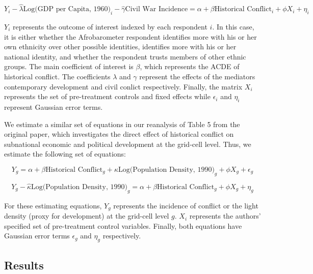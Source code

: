 \begin{equation}
Y_i - \widehat{\lambda} \text{Log(GDP per Capita, 1960)}_i - \widehat{\gamma} \text{Civil War Incidence}= \alpha + \beta \text{Historical Conflict}_i + \phi X_i + \eta_i
\end{equation}

$Y_i$ represents the outcome of interest indexed by each respondent $i$. In this case, it is either whether the Afrobarometer respondent identifies more with his or her own ethnicity over other possible identities, identifies more with his or her national identity, and whether the respondent trusts members of other ethnic groups. The main coefficient of interest is $\beta$, which represents the ACDE of historical conflict. The coefficients $\lambda$ and $\gamma$ represent the effects of the mediators contemporary development and civil conlict respectively. Finally, the matrix $X_i$ represents the set of pre-treatment controls and fixed effects while $\epsilon_i$ and $\eta_i$ represent Gaussian error terms. 

We estimate a similar set of equations in our reanalysis of Table 5 from the original paper, which investigates the direct effect of historical conflict on subnational economic and political development at the grid-cell level. Thus, we estimate the following set of equations:

\begin{equation}
Y_g = \alpha + \beta \text{Historical Conflict}_g + \kappa \text{Log(Population Density, 1990)}_g + \phi X_g + \epsilon_g
\end{equation}

\begin{equation}
Y_g - \widehat{\kappa} \text{Log(Population Density, 1990)}_g = \alpha + \beta \text{Historical Conflict}_g + \phi X_g + \eta_g
\end{equation}

For these estimating equations, $Y_g$ represents the incidence of conflict or the light density (proxy for development) at the grid-cell level $g$. $X_i$ represents the authors' specified set of pre-treatment control variables. Finally, both equations have Gaussian error terms $\epsilon_g$ and $\eta_g$ respectively. 

\subsection{Results} \label{acderesults}


